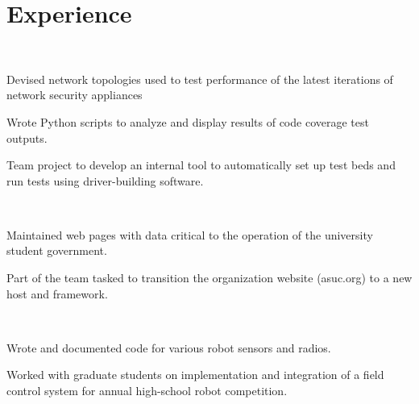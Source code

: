 \documentclass[]{deedy-resume-openfont}
\begin{document}
\begin{minipage}[t]{0.64\textwidth} 


\section{Experience}
\sectionsep
{}\\
\vspace{\topsep} %
\begin{tightemize}\item Devised network topologies used to test performance of the latest iterations of network security appliances
\item Wrote Python scripts to analyze and display results of code coverage test outputs.
\item Team project to develop an internal tool to automatically set up test beds and run tests using driver-building software.
\end{tightemize}
\sectionsep

\\
\begin{tightemize}
\item Maintained web pages with data critical to the operation of the university student government.
\item Part of the team tasked to transition the organization website (asuc.org) to a new host and framework.
\end{tightemize}
\sectionsep

\\
\begin{tightemize}
\item Wrote and documented code for various robot sensors and radios.
\item Worked with graduate students on implementation and integration of a field control system for annual high-school robot competition.
\end{tightemize}

\sectionsep


\end{minipage}
\end{document}
